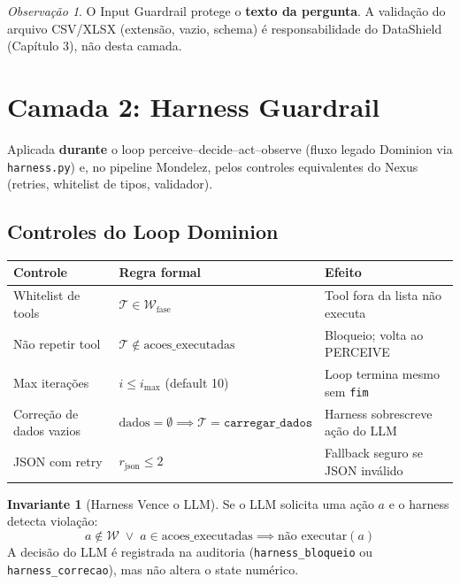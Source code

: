 \documentclass[a4paper, 12pt]{report}
\theoremstyle{definition}
\newtheorem{invariante}{Invariante}[chapter]
\theoremstyle{remark}
\newtheorem{observacao}{Observa\c{c}\~ao}[chapter]
\newcommand{\tool}{\mathcal{T}}
\begin{document}
\begin{observacao}
  O Input Guardrail protege o \textbf{texto da pergunta}. A valida\c{c}\~ao
  do arquivo CSV/XLSX (extens\~ao, vazio, schema) \'e responsabilidade
  do DataShield (Cap\'itulo 3), n\~ao desta camada.
\end{observacao}


\section{Camada 2: Harness Guardrail}

Aplicada \textbf{durante} o loop perceive--decide--act--observe
(fluxo legado Dominion via \texttt{harness.py}) e, no pipeline Mondelez,
pelos controles equivalentes do Nexus (retries, whitelist de tipos,
validador).

\subsection{Controles do Loop Dominion}

\begin{center}
\begin{tabular}{llp{5cm}}
  \toprule
  \textbf{Controle} & \textbf{Regra formal} & \textbf{Efeito} \\
  \midrule
  Whitelist de tools &
    $\tool \in \mathcal{W}_{\text{fase}}$ &
    Tool fora da lista n\~ao executa \\
  N\~ao repetir tool &
    $\tool \notin \text{acoes\_executadas}$ &
    Bloqueio; volta ao PERCEIVE \\
  Max itera\c{c}\~oes &
    $i \leq i_{\max}$ (default 10) &
    Loop termina mesmo sem \texttt{fim} \\
  Corre\c{c}\~ao de dados vazios &
    $\text{dados}=\emptyset \implies \tool=\texttt{carregar\_dados}$ &
    Harness sobrescreve a\c{c}\~ao do LLM \\
  JSON com retry &
    $r_{\text{json}} \leq 2$ &
    Fallback seguro se JSON inv\'alido \\
  \bottomrule
\end{tabular}
\end{center}

\begin{invariante}[Harness Vence o LLM]
  Se o LLM solicita uma a\c{c}\~ao $a$ e o harness detecta viola\c{c}\~ao:
  \[
    a \notin \mathcal{W} \;\lor\; a \in \text{acoes\_executadas}
    \implies \text{n\~ao executar}(a)
  \]
  A decis\~ao do LLM \'e registrada na auditoria
  (\texttt{harness\_bloqueio} ou \texttt{harness\_correcao}),
  mas n\~ao altera o state num\'erico.
\end{invariante}
\end{document}
